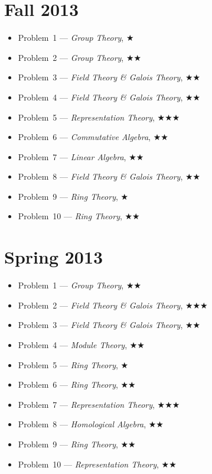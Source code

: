 \documentclass[11pt,letterpaper]{book}
\begin{document}
\section*{Fall 2013}
\begin{itemize}
\item Problem~1 --- \textit{Group Theory}, $\bigstar$
\item Problem~2 --- \textit{Group Theory}, $\bigstar\bigstar$
\item Problem~3 --- \textit{Field Theory \& Galois Theory}, $\bigstar\bigstar$
\item Problem~4 --- \textit{Field Theory \& Galois Theory}, $\bigstar\bigstar$
\item Problem~5 --- \textit{Representation Theory}, $\bigstar\bigstar\bigstar$
\item Problem~6 --- \textit{Commutative Algebra}, $\bigstar\bigstar$
\item Problem~7 --- \textit{Linear Algebra}, $\bigstar\bigstar$
\item Problem~8 --- \textit{Field Theory \& Galois Theory}, $\bigstar\bigstar$
\item Problem~9 --- \textit{Ring Theory}, $\bigstar$
\item Problem~10 --- \textit{Ring Theory}, $\bigstar\bigstar$
\end{itemize}

\section*{Spring 2013}
\begin{itemize}
\item Problem~1 --- \textit{Group Theory}, $\bigstar\bigstar$
\item Problem~2 --- \textit{Field Theory \& Galois Theory}, $\bigstar\bigstar\bigstar$
\item Problem~3 --- \textit{Field Theory \& Galois Theory}, $\bigstar\bigstar$
\item Problem~4 --- \textit{Module Theory}, $\bigstar\bigstar$
\item Problem~5 --- \textit{Ring Theory}, $\bigstar$
\item Problem~6 --- \textit{Ring Theory}, $\bigstar\bigstar$
\item Problem~7 --- \textit{Representation Theory}, $\bigstar\bigstar\bigstar$
\item Problem~8 --- \textit{Homological Algebra}, $\bigstar\bigstar$
\item Problem~9 --- \textit{Ring Theory}, $\bigstar\bigstar$
\item Problem~10 --- \textit{Representation Theory}, $\bigstar\bigstar$
\end{itemize}
\end{document}
